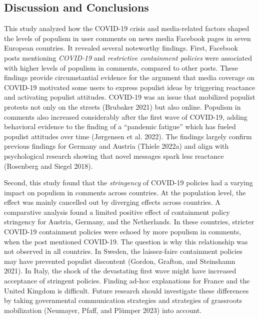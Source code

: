\documentclass[
]{ccr}
\begin{document}
\hypertarget{discussion-and-conclusions}{%
\subsection{Discussion and
Conclusions}\label{discussion-and-conclusions}}

This study analyzed how the COVID-19 crisis and media-related factors
shaped the levels of populism in user comments on news media Facebook
pages in seven European countries. It revealed several noteworthy
findings. First, Facebook posts mentioning \emph{COVID-19} and
\emph{restrictive containment policies} were associated with higher
levels of populism in comments, compared to other posts. These findings
provide circumstantial evidence for the argument that media coverage on
COVID-19 motivated some users to express populist ideas by triggering
reactance and activating populist attitudes. COVID-19 was an issue that
mobilized populist protests not only on the streets (Brubaker 2021) but
also online. Populism in comments also increased considerably after the
first wave of COVID-19, adding behavioral evidence to the finding of a
``pandemic fatigue'' which has fueled populist attitudes over time
(Jørgensen et al. 2022). The findings largely confirm previous findings
for Germany and Austria (Thiele 2022a) and align with psychological
research showing that novel messages spark less reactance (Rosenberg and
Siegel 2018).

Second, this study found that the \emph{stringency} of COVID-19 policies
had a varying impact on populism in comments across countries. At the
population level, the effect was mainly cancelled out by diverging
effects across countries. A comparative analysis found a limited
positive effect of containment policy stringency for Austria, Germany,
and the Netherlands. In these countries, stricter COVID-19 containment
policies were echoed by more populism in comments, when the post
mentioned COVID-19. The question is why this relationship was not
observed in all countries. In Sweden, the laissez-faire containment
policies may have prevented populist discontent (Gordon, Grafton, and
Steinshamn 2021). In Italy, the shock of the devastating first wave
might have increased acceptance of stringent policies. Finding ad-hoc
explanations for France and the United Kingdom is difficult. Future
research should investigate these differences by taking governmental
communication strategies and strategies of grassroots mobilization
(Neumayer, Pfaff, and Plümper 2023) into account.
\end{document}
